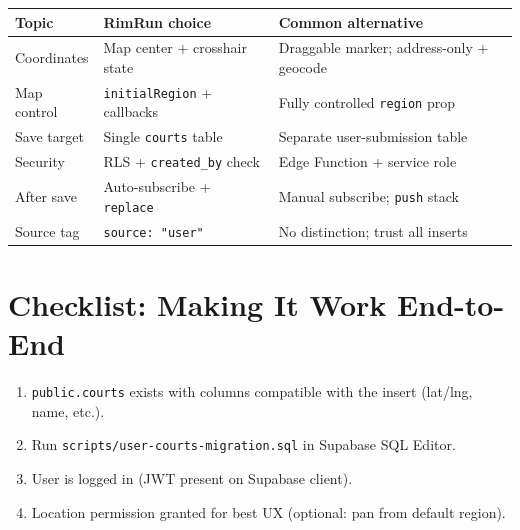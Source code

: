 \documentclass[11pt,a4paper]{article}
\begin{document}
\begin{tabular}{@{}p{3.2cm}p{4.5cm}p{4.8cm}@{}}
\toprule
\textbf{Topic} & \textbf{RimRun choice} & \textbf{Common alternative} \\
\midrule
Coordinates & Map center + crosshair state & Draggable marker; address-only + geocode \\
Map control & \texttt{initialRegion} + callbacks & Fully controlled \texttt{region} prop \\
Save target & Single \texttt{courts} table & Separate user-submission table \\
Security & RLS + \texttt{created\_by} check & Edge Function + service role \\
After save & Auto-subscribe + \texttt{replace} & Manual subscribe; \texttt{push} stack \\
Source tag & \texttt{source: "user"} & No distinction; trust all inserts \\
\bottomrule
\end{tabular}

\section{Checklist: Making It Work End-to-End}

\begin{enumerate}[noitemsep]
    \item \texttt{public.courts} exists with columns compatible with the insert (lat/lng, name, etc.).
    \item Run \texttt{scripts/user-courts-migration.sql} in Supabase SQL Editor.
    \item User is logged in (JWT present on Supabase client).
    \item Location permission granted for best UX (optional: pan from default region).
\end{enumerate}
\end{document}
